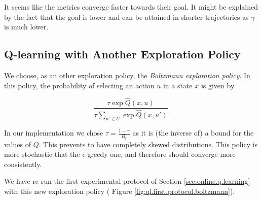 \documentclass[a4paper, 12pt]{article}
\begin{document}
    It seems like the metrics converge faster towards their goal. It might be explained by the fact that the goal is lower and can be attained in shorter trajectories as $\gamma$ is much lower.
    
    \subsection{Q-learning with Another Exploration Policy}
    
    We choose, as an other exploration policy, the \emph{Boltzmann exploration policy}. In this policy, the probability of selecting an action $u$ in a state $x$ is given by
    
    \begin{equation}
        \frac{\tau \exp \hat{Q}(x, u)}{\tau \sum_{u' \in U} \exp \hat{Q}(x, u')} .
    \end{equation}
    
    In our implementation we chose $\tau = \frac{1 - \gamma}{B_r}$ as it is (the inverse of) a bound for the values of $Q$. This prevents to have completely skewed distributions. This policy is more stochastic that the $\epsilon$-greedy one, and therefore should converge more consistently.
    
    We have re-run the first experimental protocol of Section \ref{sec:online.q.learning} with this new exploration policy (\cf{} Figure \ref{fig:ql.first.protocol.boltzmann}).
    
\end{document}
